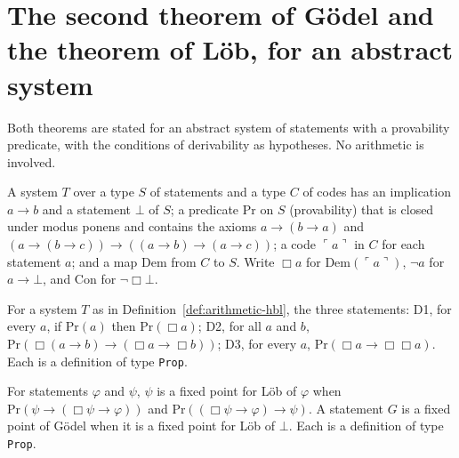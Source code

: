 \section{The second theorem of G\"odel and the theorem of L\"ob, for an abstract system}
\label{sec:arithmetic-godel}

Both theorems are stated for an abstract system of statements with a provability predicate, with the
conditions of derivability as hypotheses. No arithmetic is involved.

\begin{definition}
  \label{def:arithmetic-hbl}
  \leanok
  \own{}
  \infrastructure{}
  A system $T$ over a type $S$ of statements and a type $C$ of codes has an implication $a \to b$ and
  a statement $\bot$ of $S$; a predicate $\mathrm{Pr}$ on $S$ (provability) that is closed under
  modus ponens and contains the axioms $a \to (b \to a)$ and $(a \to (b \to c)) \to ((a \to b) \to (a
  \to c))$; a code $\ulcorner a \urcorner$ in $C$ for each statement $a$; and a map $\mathrm{Dem}$ from
  $C$ to $S$. Write $\Box a$ for $\mathrm{Dem}(\ulcorner a \urcorner)$, $\neg a$ for $a \to \bot$, and
  $\mathrm{Con}$ for $\neg \Box \bot$.
\end{definition}

\begin{definition}
  \label{def:arithmetic-derivability}
  \leanok
  For a system $T$ as in Definition~\ref{def:arithmetic-hbl}, the three statements: D1, for every $a$,
  if $\mathrm{Pr}(a)$ then $\mathrm{Pr}(\Box a)$; D2, for all $a$ and $b$, $\mathrm{Pr}(\Box(a \to b)
  \to (\Box a \to \Box b))$; D3, for every $a$, $\mathrm{Pr}(\Box a \to \Box\Box a)$. Each is a
  definition of type \texttt{Prop}.
\end{definition}

\begin{definition}
  \label{def:arithmetic-fixed-point}
  \leanok
  For statements $\varphi$ and $\psi$, $\psi$ is a fixed point for L\"ob of $\varphi$ when $\mathrm{Pr}(\psi
  \to (\Box\psi \to \varphi))$ and $\mathrm{Pr}((\Box\psi \to \varphi) \to \psi)$. A statement $G$ is a
  fixed point of G\"odel when it is a fixed point for L\"ob of $\bot$. Each is a definition of type
  \texttt{Prop}.
\end{definition}

